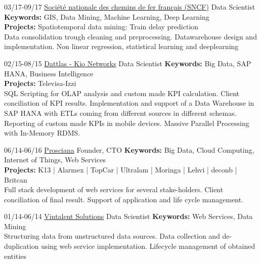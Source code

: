 \documentclass[]{friggeri-cv}
\begin{document}
\begin{entrylist}	
\entry
{03/17-09/17}
{\href{http://www.sncf.com/}{Société nationale des chemins de fer français (SNCF)}}
{Data Scientist} 
{\textbf{Keywords:} GIS, Data Mining, Machine Learning, Deep Learning\\
	\textbf{Projects:} Spatiotemporal data mining: Train delay prediction \\
	\footnotesize Data consolidation trough cleaning and preprocessing. Datawarehouse design and implementation. Non linear regression, statistical learning and deeplearning 
}

	
	
\entry
{02/15-08/15}
{\href{http://www.dattlas.com}{Dattlas - Kio Networks}}
{Data Scientist} 
{\textbf{Keywords:} Big Data, SAP HANA, Business Intelligence\\
\textbf{Projects:} Televisa-Izzi \\
\footnotesize SQL Scripting for OLAP analysis and custom made KPI calculation.
Client conciliation of KPI results.
Implementation and support of a Data Warehouse in SAP HANA with ETLs coming from different sources in different schemas. Reporting of custom made KPIs in mobile devices. Massive Parallel Processing with In-Memory RDMS.
}

\entry
{06/14-06/16}
{\href{http://www.prosciana.com}{Prosciana}}
{Founder, CTO} 
{\textbf{Keywords:} Big Data, Cloud Computing, Internet of Things, Web Services\\
\textbf{Projects:} K13 | Alarmex | TopCar | Ultralam | Moringa | Lehvi | deconb | Britcan\\
\footnotesize Full stack development of web services for several stake-holders.
Client conciliation of final result.
Support of application and life cycle management.
}

\entry
{01/14-06/14}
{\href{http://www.vintalent.com}{Vintalent Solutions}}
{Data Scientist}
{\textbf{Keywords:} Web Services, Data Mining\\
	\footnotesize Structuring data from unstructured data sources.
	Data collection and de-duplication using web service implementation.
	Lifecycle management of obtained entities}



\end{entrylist}
\end{document}
